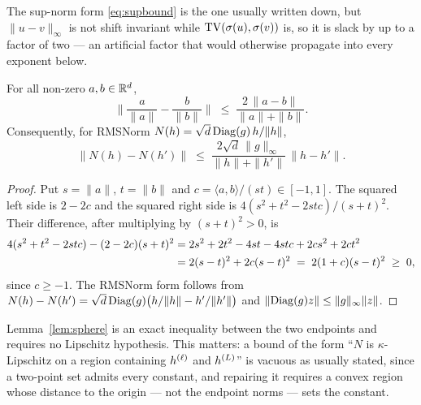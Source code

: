 \begin{remark}
The sup-norm form \eqref{eq:supbound} is the one usually written down, but
$\|u-v\|_\infty$ is not shift invariant while $\mathrm{TV}(\sigma(u),\sigma(v))$ is, so it
is slack by up to a factor of two --- an artificial factor that would otherwise
propagate into every exponent below.
\end{remark}

\begin{lemma}
\label{lem:sphere}
For all non-zero $a,b \in \mathbb{R}^{d}$,
\begin{equation}
  \Big\| \frac{a}{\|a\|} - \frac{b}{\|b\|} \Big\|
  \;\le\; \frac{2\,\|a-b\|}{\|a\| + \|b\|} .
\end{equation}
Consequently, for RMSNorm $N(h) = \sqrt d\, \mathrm{Diag}(g)\, h/\|h\|$,
\begin{equation}
  \big\|N(h) - N(h')\big\|
  \;\le\; \frac{2\sqrt d\,\|g\|_\infty}{\|h\| + \|h'\|}\,\big\|h-h'\big\| .
  \label{eq:normbound}
\end{equation}
\end{lemma}

\begin{proof}
Put $s = \|a\|$, $t = \|b\|$ and $c = \langle a,b\rangle/(st) \in [-1,1]$. The
squared left side is $2-2c$ and the squared right side is
$4(s^2+t^2-2stc)/(s+t)^2$. Their difference, after multiplying by $(s+t)^2>0$, is
\begin{align}
  4(s^2+t^2-2stc) - (2-2c)(s+t)^2
  &= 2s^2 + 2t^2 - 4st - 4stc + 2c s^2 + 2c t^2 \notag\\
  &= 2(s-t)^2 + 2c(s-t)^2 \;=\; 2(1+c)(s-t)^2 \;\ge\; 0,
\end{align}
since $c \ge -1$. The RMSNorm form follows from
$N(h)-N(h') = \sqrt d\,\mathrm{Diag}(g)\big(h/\|h\| - h'/\|h'\|\big)$ and
$\|\mathrm{Diag}(g)z\| \le \|g\|_\infty\|z\|$.
\end{proof}

\begin{remark}
Lemma~\ref{lem:sphere} is an exact inequality between the two endpoints and
requires no Lipschitz hypothesis. This matters: a bound of the form ``$N$ is
$\kappa$-Lipschitz on a region containing $h^{(\ell)}$ and $h^{(L)}$'' is vacuous
as usually stated, since a two-point set admits every constant, and repairing it
requires a convex region whose distance to the origin --- not the endpoint norms
--- sets the constant.
\end{remark}

